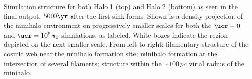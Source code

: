 \label{fig:structure}
Simulation structure for both Halo 1 (top) and Halo 2 (bottom) as seen in the final output, $5000\yr$ after the first sink forms.  Shown is a density projection of the minihalo environment on progressively smaller scales for both the $\ucr=0$ and $\ucr=10^5\,u_0$ simulations, as labeled.  White boxes indicate the region depicted on the next smaller scale.  From left to right: filamentary structure of the cosmic web near the minihalo formation site; minihalo formation at the intersection of several filaments; structure within the $\sim$$100\,pc$ virial radius of the minihalo.